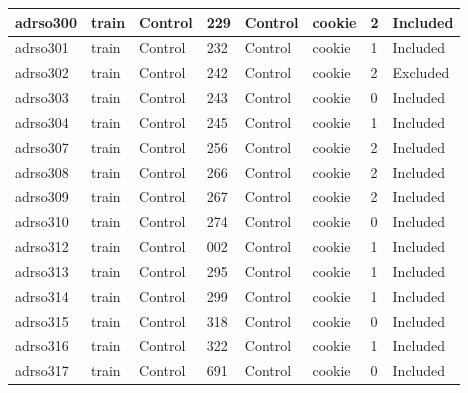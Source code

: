 \begin{center}
\begin{longtable}{|l|l|l|l|l|l|l|l|}
adrso300  & train            & Control      & 229         & Control              & cookie          & 2                & Included      \\ \hline
adrso301  & train            & Control      & 232         & Control              & cookie          & 1                & Included      \\ \hline
adrso302  & train            & Control      & 242         & Control              & cookie          & 2                & Excluded      \\ \hline
adrso303  & train            & Control      & 243         & Control              & cookie          & 0                & Included      \\ \hline
adrso304  & train            & Control      & 245         & Control              & cookie          & 1                & Included      \\ \hline
adrso307  & train            & Control      & 256         & Control              & cookie          & 2                & Included      \\ \hline
adrso308  & train            & Control      & 266         & Control              & cookie          & 2                & Included      \\ \hline
adrso309  & train            & Control      & 267         & Control              & cookie          & 2                & Included      \\ \hline
adrso310  & train            & Control      & 274         & Control              & cookie          & 0                & Included      \\ \hline
adrso312  & train            & Control      & 002         & Control              & cookie          & 1                & Included      \\ \hline
adrso313  & train            & Control      & 295         & Control              & cookie          & 1                & Included      \\ \hline
adrso314  & train            & Control      & 299         & Control              & cookie          & 1                & Included      \\ \hline
adrso315  & train            & Control      & 318         & Control              & cookie          & 0                & Included      \\ \hline
adrso316  & train            & Control      & 322         & Control              & cookie          & 1                & Included      \\ \hline
adrso317  & train            & Control      & 691         & Control              & cookie          & 0                & Included      \\ \hline
\end{longtable}
\normalsize
\end{center}
